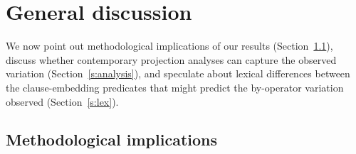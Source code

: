 \documentclass[a4paper,12pt,twoside]{article}
\begin{document}


 


\section{General discussion}\label{s:general}

    We now point out methodological implications of our results (Section~\ref{s:method-impl}), discuss whether contemporary projection analyses can capture the observed variation (Section~\ref{s:analysis}), and speculate about lexical differences between the clause-embedding predicates that might predict the by-operator variation observed (Section~\ref{s:lex}).

\subsection{Methodological implications}\label{s:method-impl}
\end{document}
